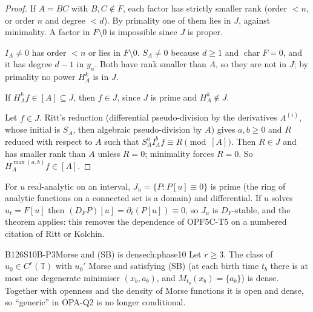 \begin{proof}
If $A=BC$ with $B,C\notin F$, each factor has strictly smaller rank (order $<n$, or order $n$ and degree $<d$). By primality one of them lies in $J$, against minimality. A factor in $F\setminus0$ is impossible since $J$ is proper.

$I_A\ne0$ has order $<n$ or lies in $F\setminus0$. $S_A\ne0$ because $d\ge1$ and $\operatorname{char}F=0$, and it has degree $d-1$ in $y_n$. Both have rank smaller than $A$, so they are not in $J$; by primality no power $H_A^k$ is in $J$.

If $H_A^kf\in[A]\subseteq J$, then $f\in J$, since $J$ is prime and $H_A^k\notin J$.

Let $f\in J$. Ritt's reduction (differential pseudo-division by the derivatives $A^{(i)}$, whose initial is $S_A$, then algebraic pseudo-division by $A$) gives $a,b\ge0$ and $R$ reduced with respect to $A$ such that $S_A^aI_A^bf\equiv R\pmod{[A]}$. Then $R\in J$ and has smaller rank than $A$ unless $R=0$; minimality forces $R=0$. So $H_A^{\max(a,b)}f\in[A]$.

\end{proof}

\begin{caution}[title=Application to a solution]
For $u$ real-analytic on an interval, $J_u=\{P:P[u]\equiv0\}$ is prime (the ring of analytic functions on a connected set is a domain) and differential. If $u$ solves $u_t=F[u]$ then $(D_FP)[u]=\partial_t(P[u])\equiv0$, so $J_u$ is $D_F$-stable, and the theorem applies: this removes the dependence of OPF5C-T5 on a numbered citation of Ritt or Kolchin.
\end{caution}

\begin{dimcard}{B126}{S10B-P3}{Morse and (SB) is dense}{\pw}{ch:phase10}
Let $r\ge3$. The class of $u_0\in C^r(\mathbb T)$ with $u_0'$ Morse and satisfying (SB) (at each birth time $t_b$ there is at most one degenerate minimiser $(x_b,a_b)$, and $M_{t_b}(x_b)=\{a_b\}$) is dense. Together with openness and the density of Morse functions it is open and dense, so ``generic'' in OPA-Q2 is no longer conditional.
\end{dimcard}

